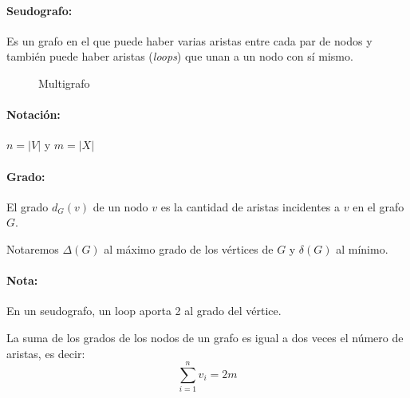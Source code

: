 \paragraph{Seudografo:} Es un grafo en el que puede haber varias aristas entre cada par de nodos y también puede haber aristas (\textit{loops}) que unan a un nodo con sí mismo.

\begin{figure}[H]
	\begin{center}
	\end{center}
	\caption{Multigrafo}
\end{figure}

\paragraph{Notación:} \(n = |V|\) y \(m=|X|\)

\paragraph{Grado:} El grado \(d_G(v)\) de un nodo \(v\) es la cantidad de aristas incidentes a \(v\) en el grafo \(G\).

Notaremos \(\Delta(G)\) al máximo grado de los vértices de \(G\) y \(\delta(G)\) al mínimo.

\paragraph{Nota:} En un seudografo, un loop aporta 2 al grado del vértice.

\begin{theorem}
	La suma de los grados de los nodos de un grafo es igual a dos veces el número de aristas, es decir: \[\sum_{i=1}^{n}v_i = 2m\]
\end{theorem}


